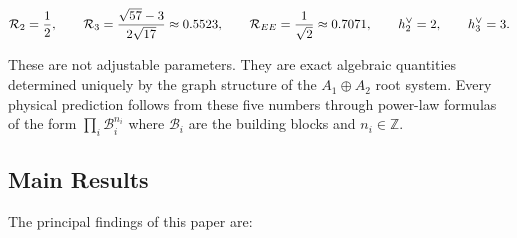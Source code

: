\begin{equation}
\mathcal{R}_2 = \frac{1}{2}, \qquad
\mathcal{R}_3 = \frac{\sqrt{57}-3}{2\sqrt{17}} \approx 0.5523, \qquad
\mathcal{R}_{EE} = \frac{1}{\sqrt{2}} \approx 0.7071, \qquad
h^\vee_2 = 2, \qquad
h^\vee_3 = 3.
\end{equation}

These are not adjustable parameters. They are exact algebraic quantities determined uniquely by the graph structure of the $A_1 \oplus A_2$ root system. Every physical prediction follows from these five numbers through power-law formulas of the form $\prod_i \mathcal{B}_i^{n_i}$ where $\mathcal{B}_i$ are the building blocks and $n_i \in \mathbb{Z}$.

\subsection{Main Results}\label{sec:results}

The principal findings of this paper are:

